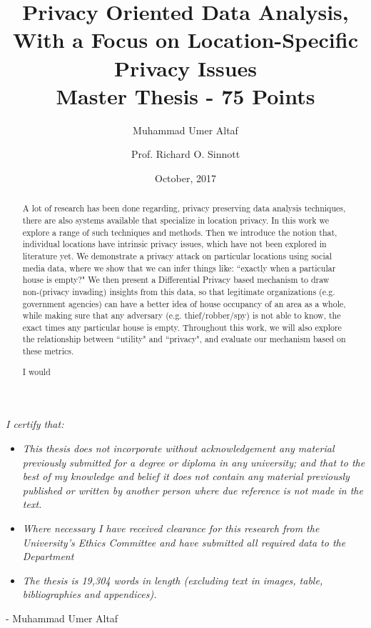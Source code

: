 \documentclass[12pt]{report}
\title{Privacy Oriented Data Analysis,\\With a Focus on Location-Specific Privacy Issues\\\large{Master Thesis - 75 Points}}
\author[]{Muhammad Umer Altaf}
\author[]{Prof. Richard O. Sinnott}
\affil[]{School of Computing and Information Systems,}
\affil[]{The University of Melbourne}
\date{October, 2017}
\theoremstyle{named}
\begin{document}
\maketitle

\begin{abstract}
   A lot of research has been done regarding, privacy preserving data analysis techniques, there are also systems available that specialize in location privacy. In this work we explore a range of such techniques and methods.  Then we introduce the notion that, individual locations have intrinsic privacy issues, which have not been explored in literature yet. We demonstrate a privacy attack on particular locations using social media data, where we show that we can infer things like: ``exactly when a particular house is empty?" We then present a Differential Privacy based mechanism to draw non-(privacy invading) insights from this data, so that legitimate organizations (e.g. government agencies) can have a better idea of house occupancy of an area as a whole, while making sure that any adversary (e.g. thief/robber/spy) is not able to know, the exact times any particular house is empty. Throughout this work, we will also explore the relationship between ``utility" and ``privacy", and evaluate our mechanism based on these metrics. 
\end{abstract}
\renewcommand{\abstractname}{Acknowledgements}
\begin{abstract}
 I would 
\end{abstract}

\setcounter{tocdepth}{1}
\tableofcontents
\pagebreak




\textit{I certify that:}
\begin{itemize}
\item \textit{This thesis does not incorporate without acknowledgement any material previously submitted for a degree or diploma in any university; and that to the best of my knowledge and belief it does not contain any material
previously published or written by another person where due reference is not made in the text.}
\item \textit{Where necessary I have received clearance for this research from the University's Ethics Committee and have submitted all required data to the Department }
\item \textit{The thesis is 19,304 words in length (excluding text in images, table, bibliographies and appendices).}
\end{itemize}
- Muhammad Umer Altaf
\pagebreak
\thispagestyle{empty}
 
\end{document}
